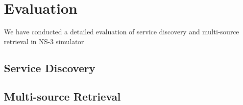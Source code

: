 \section{Evaluation}
We have conducted a detailed evaluation of service discovery and multi-source retrieval in NS-3 simulator
\subsection{Service Discovery}
\subsection{Multi-source Retrieval}

